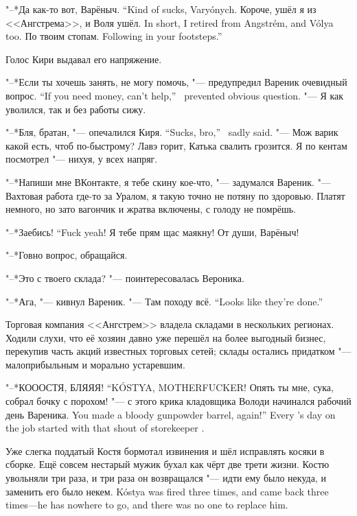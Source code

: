 {"--*Да как-то вот, Варёныч.}
{``Kind of sucks, Vary\'onych.}
{Короче, ушёл я из <<Ангстрема>>, и Воля ушёл.}
{In short, I retired from Angstr\'em, and V\'olya too.}
{По твоим стопам.}
{Following in your footsteps.''}

Голос Кири выдавал его напряжение.

{"--*Если ты хочешь занять, не могу помочь, "--- предупредил Вареник очевидный вопрос.}
{``If you need money, can't help,'' \Varenik\ prevented obvious question.}
"--- Я как уволился, так и без работы сижу.

{"--*Бля, братан, "--- опечалился Киря.}
{``Sucks, bro,'' \Kirya\ sadly said.}
"--- Мож варик какой есть, чтоб по-быстрому?
Лавэ горит, Катька свалить грозится.
Я по кентам посмотрел "--- нихуя, у всех напряг.

"--*Напиши мне ВКонтакте, я тебе скину кое-что, "--- задумался Вареник.
"--- Вахтовая работа где-то за Уралом, я такую точно не потяну по здоровью.
Платят немного, но зато вагончик и жратва включены, с голоду не помрёшь.

{"--*Заебись!}
{``Fuck yeah!}
Я тебе прям щас маякну!
От души, Варёныч!

"--*Говно вопрос, обращайся.

"--*Это с твоего склада? "--- поинтересовалась Вероника.

"--*Ага, "--- кивнул Вареник.
{"--- Там походу всё.}
{``Looks like they're done.''}

\asterism

Торговая компания <<Ангстрем>> владела складами в нескольких регионах.
Ходили слухи, что её хозяин давно уже перешёл на более выгодный бизнес, перекупив часть акций известных торговых сетей;
склады остались придатком "--- малоприбыльным и морально устаревшим.

{"--*КОООСТЯ, БЛЯЯЯ!}
{``K\'OSTYA, MOTHERFUCKER!}
{Опять ты мне, сука, собрал бочку с порохом! "--- с этого крика кладовщика Володи начинался рабочий день Вареника.}
{You made a bloody gunpowder barrel, again!'' Every \Varenik's day on the job started with that shout of storekeeper \Volodya.}

Уже слегка поддатый Костя бормотал извинения и шёл исправлять косяки в сборке.
Ещё совсем нестарый мужик бухал как чёрт две трети жизни.
{Костю увольняли три раза, и три раза он возвращался "--- идти ему было некуда, и заменить его было некем.}
{K\'ostya was fired three times, and came back three times---he has nowhere to go, and there was no one to replace him.}

